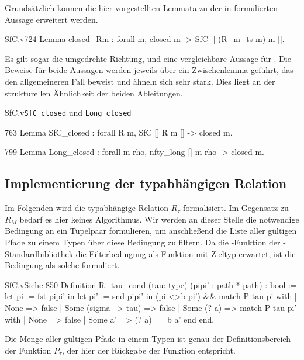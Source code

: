 Grundsätzlich können die hier vorgestellten Lemmata zu der in  formulierten Aussage erweitert werden.
\begin{code}[closed_Rm]{SfC.v}{}{724}
Lemma closed_Rm : forall m, closed m -> SfC [] (R_m_ts m) m [].  
\end{code}
Es gilt sogar die umgedrehte Richtung, und eine vergleichbare Aussage für . Die Beweise für beide Aussagen werden jeweils über ein Zwischenlemma geführt, das den allgemeineren Fall beweist und ähneln sich sehr stark. Dies liegt an der strukturellen Ähnlichkeit der beiden Ableitungen.
\begin{multicode}{SfC.v}{}{\texttt{SfC\_closed} und \texttt{Long\_closed}}
   \begin{mcode}{763}
Lemma SfC_closed : forall R m, SfC [] R m [] -> closed m.
\end{mcode}
\begin{mcode}{799}
Lemma Long_closed : forall m rho, nfty_long [] m rho -> closed m.
\end{mcode}
\end{multicode}

\subsection{Implementierung der typabhängigen Relation}

Im Folgenden wird die typabhängige Relation $R_\tau$ formalisiert. Im Gegensatz zu $R_M$ bedarf es hier keines Algorithmus. Wir werden an dieser Stelle die notwendige Bedingung an ein Tupelpaar formulieren, um anschließend die Liste aller gültigen Pfade zu einem Typen über diese Bedingung zu filtern. Da die -Funktion der \coq{}-Standardbibliothek die Filterbedingung als Funktion mit Zieltyp  erwartet, ist die Bedingung als solche formuliert. 
\begin{code}{SfC.v}{Siehe }{850}
Definition R_tau_cond (tau: type) (pipi' : path * path) : bool :=
  let pi := fst pipi' in
  let pi' := snd pipi' in
  (pi <>b pi') && 
    match P tau pi with
    | None => false
    | Some (sigma ~> tau) => false
    | Some (? a) => match P tau pi' with
        | None => false
        | Some a' => (? a) ==b a'
        end
    end.
\end{code}

Die Menge aller gültigen Pfade in einem Typen ist genau der Definitionsbereich der Funktion $P_\tau$, der hier der Rückgabe der Funktion  entspricht.

